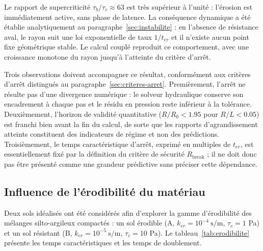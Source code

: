 \documentclass[11pt,a4paper]{report}
\newcommand{\ter}{{t_{er}}}
\begin{document}
Le rapport de supercriticité \(\tau_b/\tau_c \approx 63\) est très supérieur à l'unité : l'érosion est
immédiatement active, sans phase de latence. La conséquence dynamique a été établie analytiquement au
paragraphe~\ref{sec:instabilite} : en l'absence de résistance aval, le rayon suit une loi exponentielle
de taux \(1/\ter\) et il n'existe aucun point fixe géométrique stable. Le calcul couplé reproduit ce
comportement, avec une croissance monotone du rayon jusqu'à l'atteinte du critère d'arrêt.

Trois observations doivent accompagner ce résultat, conformément aux critères d'arrêt
distingués au paragraphe~\ref{sec:criteres-arret}. Premièrement, l'arrêt ne résulte pas d'une divergence
numérique : le solveur hydraulique conserve son encadrement à chaque pas et le résidu en pression reste
inférieur à la tolérance. Deuxièmement, l'horizon de validité quantitative
(\(R/R_0 < 1.95\) pour \(R/L<0.05\)) est franchi bien avant la fin du calcul, de sorte que les rapports
d'agrandissement atteints constituent des indicateurs de régime et non des prédictions. Troisièmement, le
temps caractéristique d'arrêt, exprimé en multiples de \(\ter\), est essentiellement fixé par la définition
du critère de sécurité \(R_{\mathrm{break}}\) ; il ne doit donc pas être présenté comme une grandeur
prédictive sans préciser cette dépendance.

\subsection{Influence de l'érodibilité du matériau}

Deux sols idéalisés ont été considérés afin d'explorer la gamme d'érodibilité des mélanges silto-argileux
compactés : un sol érodible (A, \(k_{er} = 10^{-4}\ \mathrm{s/m}\), \(\tau_c = 1\) Pa) et un sol résistant
(B, \(k_{er} = 10^{-5}\ \mathrm{s/m}\), \(\tau_c = 10\) Pa). Le tableau~\ref{tab:erodibilite} présente les
temps caractéristiques et les temps de doublement.
\end{document}
